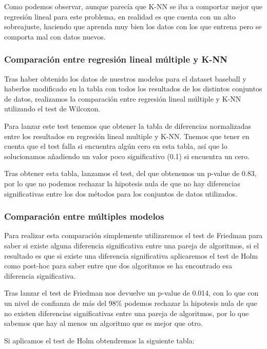 Como podemos observar, aunque parecía que K-NN se iba a comportar mejor que regresión lineal para este problema, en realidad es que cuenta con un alto sobreajuste, haciendo que aprenda muy bien los datos con los que entrena pero se comporta mal con datos nuevos.

\subsubsection{Comparación entre regresión lineal múltiple y K-NN}

Tras haber obtenido los datos de nuestros modelos para el dataset baseball y haberlos modificado en la tabla con todos los resultados de los distintos conjuntos de datos, realizamos la comparación entre regresión lineal múltiple y K-NN utilizando el test de Wilcoxon.

Para lanzar este test tenemos que obtener la tabla de diferencias normalizadas entre los resultados en regresión lineal multiple y K-NN. Tnemos que tener en cuenta que el test falla si encuentra algún cero en esta tabla, así que lo solucionamos añadiendo un valor poco significativo (0.1) si encuentra un cero.

Tras obtener esta tabla, lanzamos el test, del que obtenemos un p-value de 0.83, por lo que no podemos rechazar la hipotesis nula de que no hay diferencias significativas entre los dos métodos para los conjuntos de datos utilizados.

\subsubsection{Comparación entre múltiples modelos}

Para realizar esta comparación simplemente utilizaremos el test de Friedman para saber si existe alguna diferencia significativa entre una pareja de algoritmos, si el resultado es que si existe una diferencia significativa aplicaremos el test de Holm como post-hoc para saber entre que dos algoritmos se ha encontrado esa diferencia significativa.

Tras lanzar el test de Friedman nos devuelve un p-value de 0.014, con lo que con un nivel de confianza de más del 98\% podemos rechazar la hipotesis nula de que no existen diferencias significativas entre una pareja de algoritmos, por lo que sabemos que hay al menos un algoritmo que es mejor que otro.

Si aplicamos el test de Holm obtendremos la siguiente tabla:

\begin{table}[H]
\centering
{}
\end{table}

